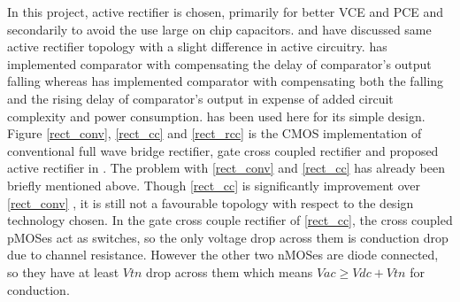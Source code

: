 \documentclass[12pt,a4paper,UKenglish]{article}
\begin{document}
In this project, active rectifier is chosen, primarily for better VCE and PCE and secondarily to avoid the use large on chip capacitors. \cite{rectrcc}  and \cite{rectcomp} have discussed same active rectifier topology with a slight difference in active circuitry. \cite{rectrcc} has implemented comparator with compensating the delay of comparator's output falling whereas \cite{rectcomp} has implemented comparator with compensating both the falling and the rising delay of comparator's output in expense of added circuit complexity and power consumption. \cite{rectrcc} has been used here for its simple design. \\

Figure \ref{rect_conv}, \ref{rect_cc} and \ref{rect_rcc} is the CMOS implementation of conventional full wave bridge rectifier, gate cross coupled rectifier and proposed active rectifier in \cite{rectrcc}. The problem with \ref{rect_conv} and \ref{rect_cc} has already been briefly mentioned above. Though  \ref{rect_cc}  is significantly improvement over  \ref{rect_conv} , it is still not a favourable topology with respect to the design technology chosen. In the gate cross couple rectifier of  \ref{rect_cc}, the cross coupled pMOSes act as switches, so the only voltage drop across them is conduction drop due to channel resistance. However the other two nMOSes are diode connected, so they have at least $Vtn$ drop across them which means $Vac \geq Vdc + Vtn$ for conduction. 
\end{document}
